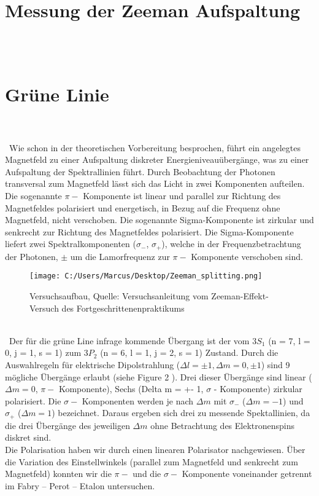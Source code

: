 \documentclass[10pt,a4paper]{article}
\begin{document}
\chapter{Messung der Zeeman Aufspaltung}
\\\

\chapter{Grüne Linie}
\\\\\
Wie schon in der theoretischen Vorbereitung besprochen, führt ein angelegtes Magnetfeld zu einer Aufspaltung diskreter Energieniveauübergänge, was zu einer Aufspaltung der Spektrallinien führt. Durch Beobachtung der Photonen transversal zum Magnetfeld lässt sich das Licht in zwei Komponenten aufteilen. Die sogenannte $\pi - $ Komponente ist linear und parallel zur Richtung des Magnetfeldes polarisiert und energetisch, in Bezug auf die Frequenz ohne Magnetfeld, nicht verschoben. Die sogenannte Sigma-Komponente ist zirkular und senkrecht zur Richtung des Magnetfeldes polarisiert. Die Sigma-Komponente liefert zwei Spektralkomponenten ($\sigma _{-}$, $\sigma _{+}$), welche in der Frequenzbetrachtung der Photonen, $\pm $ um   die Lamorfrequenz zur $\pi - $ Komponente verschoben sind.  
\\
\begin{figure}[h]
	\texttt{[image: C:/Users/Marcus/Desktop/Zeeman\_splitting.png]}
	\centering
	\caption{Versuchsaufbau, Quelle: Versuchsanleitung vom Zeeman-Effekt-Versuch des Fortgeschrittenenpraktikums}
	\label{aufbau}
\end{figure}
\\\
Der für die grüne Line infrage kommende Übergang ist der vom $3S_{1}$ (n = 7, l = 0, j = 1, s = 1) zum $3P_{2}$ (n = 6, l = 1, j = 2, s = 1) Zustand. Durch die Auswahlregeln für elektrische Dipolstrahlung ($\Delta l = \pm 1 , \Delta m =  0,\pm1$) sind 9 mögliche Übergänge erlaubt (siehe Figure 2 ). Drei dieser Übergänge sind linear ($\Delta m = 0$, $\pi - $ Komponente), Sechs (Delta m = +- 1, $\sigma   $ - Komponente) zirkular polarisiert. Die $\sigma -  $ Komponenten  werden je nach $ \Delta m $ mit $\sigma _{-}  $ ($\Delta m = -1$) und $\sigma _{+}  $ ($\Delta m = 1$) bezeichnet.   Daraus ergeben sich drei zu messende Spektallinien, da die drei Übergänge des jeweiligen $\Delta m$ ohne Betrachtung des Elektronenspins diskret sind.
\\
Die Polarisation haben wir durch einen linearen Polarisator nachgewiesen. Über die Variation des Einstellwinkels (parallel zum Magnetfeld und senkrecht zum Magnetfeld) konnten wir die $\pi - $  und die $\sigma  - $ Komponente voneinander getrennt im Fabry – Perot – Etalon untersuchen. 
\end{document}
